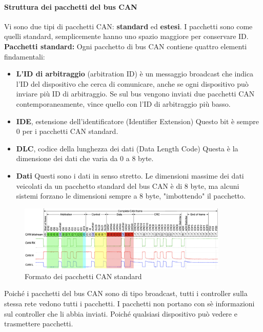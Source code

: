 \documentclass[12pt, a4paper, italian]{report}
\numberwithin{figure}{chapter}
\numberwithin{table}{chapter}
\begin{document}
\paragraph{Struttura dei pacchetti del bus CAN}
Vi sono due tipi di pacchetti CAN: 
\textbf{standard} ed \textbf{estesi}. I pacchetti sono come quelli standard, semplicemente hanno uno spazio maggiore per conservare ID. \textbf{Pacchetti standard:} Ogni pacchetto di bus CAN contiene quattro elementi findamentali:
\begin{itemize}
    \item \textbf{L'ID di arbitraggio} (arbitration ID) è un messaggio broadcast che indica l'ID del dispositivo che cerca di comunicare, anche se ogni dispositivo può inviare più ID di arbitraggio. Se sul bus vengono inviati due pacchetti CAN contemporaneamente, vince quello con l'ID di arbitraggio più basso.
    \item \textbf{IDE}, estensione dell'identificatore (Identifier Extension) Questo bit è sempre 0 per i pacchetti CAN standard.
    \item \textbf{DLC}, codice della lunghezza dei dati (Data Length Code) Questa è la dimensione dei dati che varia da 0 a 8 byte.
    \item \textbf{Dati} Questi sono i dati in senso stretto. Le dimensioni massime dei dati veicolati da un pacchetto standard del bus CAN è di 8 byte, ma alcuni sistemi forzano le dimensioni sempre a 8 byte, "imbottendo" il pacchetto.
\end{itemize}

\begin{figure}[h]
  \centering
  \includegraphics[width=10cm]{FrameCAN.png}
  \caption{Formato dei pacchetti CAN standard}
  \label{fig:pacchettoCAN}
\end{figure}

Poiché i pacchetti del bus CAN sono di tipo broadcast, tutti i controller sulla stessa rete vedono tutti i pacchetti. I pacchetti non portano con sè informazioni sul controller che li abbia inviati. Poiché qualsiasi dispositivo può vedere e trasmettere pacchetti.
\end{document}
